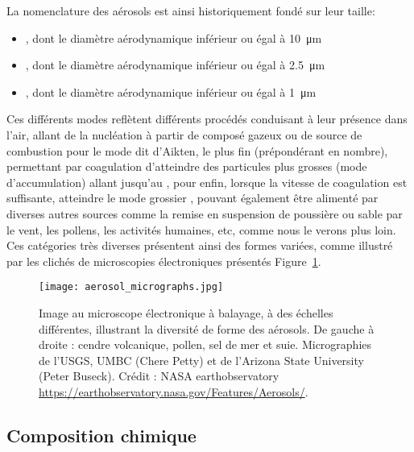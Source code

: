 La nomenclature des aérosols est ainsi historiquement fondé sur leur taille:
\begin{itemize}
    \item \PMdix, dont le diamètre aérodynamique inférieur ou égal à \SI{10}{\um}
    \item \PMdc, dont le diamètre aérodynamique inférieur ou égal à \SI{2.5}{\um}
    \item \PMun, dont le diamètre aérodynamique inférieur ou égal à \SI{1}{\um}
\end{itemize}

Ces différents modes reflètent différents procédés conduisant à leur présence dans l'air,
allant de la nucléation à partir de composé gazeux ou de source de combustion pour le mode
dit d'Aikten, le plus fin (prépondérant en nombre), permettant par coagulation
d'atteindre des particules plus grosses (mode d'accumulation) allant jusqu'au \PMdc, pour
enfin, lorsque la vitesse de coagulation est suffisante, atteindre le mode grossier
\PMdix, pouvant également être alimenté par diverses autres sources comme la remise en
suspension de poussière ou sable par le vent, les pollens, les activités humaines, etc,
comme nous le verons plus loin.
Ces catégories très diverses présentent ainsi des formes variées, comme illustré par les
clichés de microscopies électroniques présentés Figure~\ref{fig:micrography}.

\begin{figure}[ht]
    \centering
    \texttt{[image: aerosol\_micrographs.jpg]}
    \caption{Image au microscope électronique à balayage, à des échelles différentes,
        illustrant la diversité de forme des aérosols.
        De gauche à droite : cendre volcanique, pollen, sel de mer et suie. Micrographies de
        l'USGS, UMBC (Chere Petty) et de l'Arizona State University (Peter Buseck). 
        Crédit : NASA earthobservatory \url{https://earthobservatory.nasa.gov/Features/Aerosols/}.
    }
    \label{fig:micrography}
\end{figure}

\subsection{Composition chimique}%
\label{ssub:composition_chimique}

